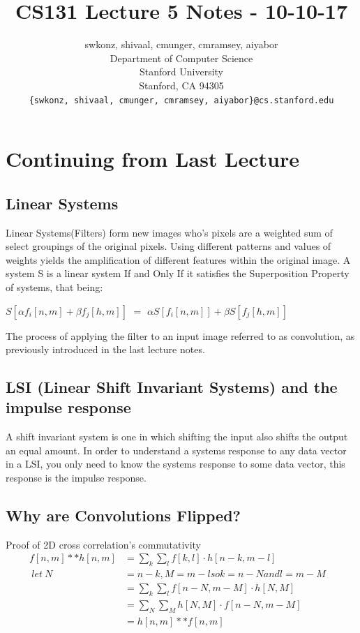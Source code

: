 \documentclass{article}
\title{CS131 Lecture 5 Notes - 10-10-17}
\author{
  swkonz, shivaal, cmunger, cmramsey, aiyabor \\
  Department of Computer Science\\
  Stanford University\\
  Stanford, CA 94305 \\
  \texttt{\{swkonz, shivaal, cmunger, cmramsey, aiyabor\}@cs.stanford.edu} \\
}
\begin{document}
\maketitle

\section{Continuing from Last Lecture}
\subsection{Linear Systems}
Linear Systems(Filters) form new images who's pixels are a weighted sum of select groupings of the original pixels. Using different patterns and values of weights yields the amplification of different features within the original image. A system S is a linear system If and Only If it satisfies the Superposition Property of systems, that being:
\begin{center}
$S[\alpha f_i[n,m] + \beta f_j[h,m]]$ $=$ $\alpha S[f_i[n,m]] + \beta S[f_j[h,m]]$
\end{center}

The process of applying the filter to an input image referred to as convolution, as previously introduced in the last lecture notes.

\subsection{LSI (Linear Shift Invariant Systems) and the impulse response}
A shift invariant system is one in which shifting the input also shifts the output an equal amount. In order to understand a systems response to any data vector in a LSI, you only need to know the systems response to some data vector, this response is the impulse response. 

\subsection{Why are Convolutions Flipped?}
Proof of 2D cross correlation's commutativity
\begin{align}
f[n,m] * * h[n,m] &= \sum_{k}^{} \sum_{l}^{} f[k,l] \cdot h[n-k,m-l]&\\
\ let \ N &= n - k, M = m-l so k = n - N and l = m - M &\\
&= \sum_{k}^{} \sum_{l}^{} f[n-N, m-M] \cdot h[N,M]&\\
&= \sum_{N}^{} \sum_{M}^{} h[N,M] \cdot f[n-N, m-M] &\\
&= h[n,m] * * f[n,m]&\\
\end{align}
\end{document}
